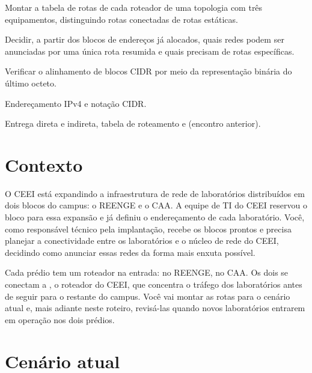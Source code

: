 \documentclass[11pt,a4paper]{article}
\begin{document}
\cabecalholab

\begin{objetivos}
  \item Montar a tabela de rotas de cada roteador de uma topologia com três equipamentos, distinguindo rotas conectadas de rotas estáticas.
  \item Decidir, a partir dos blocos de endereços já alocados, quais redes podem ser anunciadas por uma única rota resumida e quais precisam de rotas específicas.
  \item Verificar o alinhamento de blocos CIDR por meio da representação binária do último octeto.
\end{objetivos}

\begin{prerequisitos}
  \item Endereçamento IPv4 e notação CIDR.
  \item Entrega direta e indireta, tabela de roteamento e  (encontro anterior).
\end{prerequisitos}

\newpage
\section{Contexto}

O CEEI está expandindo a infraestrutura de rede de laboratórios distribuídos em dois blocos do campus: o REENGE e o CAA. A equipe de TI do CEEI reservou o bloco  para essa expansão e já definiu o endereçamento de cada laboratório. Você, como responsável técnico pela implantação, recebe os blocos prontos e precisa planejar a conectividade entre os laboratórios e o núcleo de rede do CEEI, decidindo como anunciar essas redes da forma mais enxuta possível.

Cada prédio tem um roteador na entrada:  no REENGE,  no CAA. Os dois se conectam a , o roteador do CEEI, que concentra o tráfego dos laboratórios antes de seguir para o restante do campus. Você vai montar as rotas para o cenário atual e, mais adiante neste roteiro, revisá-las quando novos laboratórios entrarem em operação nos dois prédios.

\section{Cenário atual}
\end{document}
